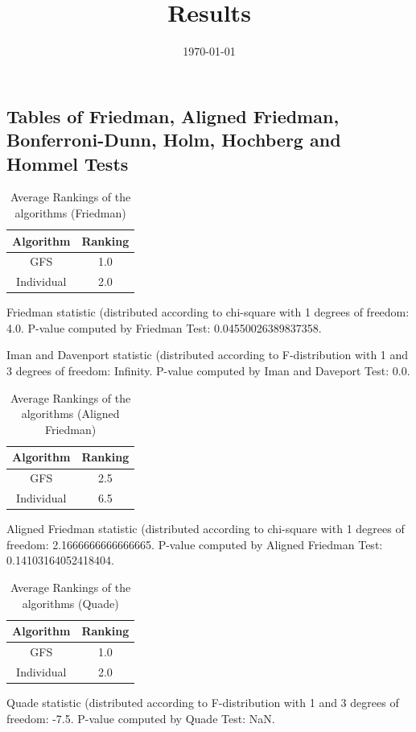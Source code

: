 \documentclass[a4paper,10pt]{article}
\title{Results}
\author{}
\date{\today}
\begin{document}
\begin{landscape}
\oddsidemargin 0in \topmargin 0in\maketitle
\section{Tables of Friedman, Aligned Friedman, Bonferroni-Dunn, Holm, Hochberg and Hommel Tests}
\begin{table}[!htp]
\centering
\caption{Average Rankings of the algorithms (Friedman)
}\begin{tabular}{c|c}
Algorithm&Ranking\\
\hline
GFS&1.0\\
Individual&2.0\\
\end{tabular}
\end{table}


Friedman statistic (distributed according to chi-square with 1 degrees of freedom: 4.0. 
P-value computed by Friedman Test: 0.04550026389837358.\newline

Iman and Davenport statistic (distributed according to F-distribution with 1 and 3 degrees of freedom: Infinity. 
P-value computed by Iman and Daveport Test: 0.0.\newline


\newpage

\begin{table}[!htp]
\centering
\caption{Average Rankings of the algorithms (Aligned Friedman)
}\begin{tabular}{c|c}
Algorithm&Ranking\\
\hline
GFS&2.5\\
Individual&6.5\\
\end{tabular}
\end{table}


Aligned Friedman statistic (distributed according to chi-square with 1 degrees of freedom: 2.1666666666666665. 
P-value computed by Aligned Friedman Test: 0.14103164052418404.\newline


\newpage

\begin{table}[!htp]
\centering
\caption{Average Rankings of the algorithms (Quade)
}\begin{tabular}{c|c}
Algorithm&Ranking\\
\hline
GFS&1.0\\
Individual&2.0\\
\end{tabular}
\end{table}
Quade statistic (distributed according to F-distribution with 1 and 3 degrees of freedom: -7.5. 
P-value computed by Quade Test: NaN.\newline



\end{landscape}
\end{document}
